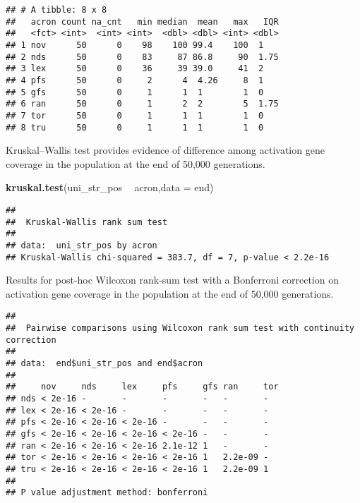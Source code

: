 \documentclass[]{book}
\newenvironment{Shaded}{\begin{snugshade}}{\end{snugshade}}
\newcommand{\DataTypeTok}[1]{\textcolor[rgb]{0.13,0.29,0.53}{#1}}
\newcommand{\KeywordTok}[1]{\textcolor[rgb]{0.13,0.29,0.53}{\textbf{#1}}}
\newcommand{\NormalTok}[1]{#1}
\newcommand{\OperatorTok}[1]{\textcolor[rgb]{0.81,0.36,0.00}{\textbf{#1}}}
\newcommand{\OtherTok}[1]{\textcolor[rgb]{0.56,0.35,0.01}{#1}}
\newcommand{\StringTok}[1]{\textcolor[rgb]{0.31,0.60,0.02}{#1}}
\begin{document}
\begin{verbatim}
## # A tibble: 8 x 8
##   acron count na_cnt   min median  mean   max   IQR
##   <fct> <int>  <int> <int>  <dbl> <dbl> <int> <dbl>
## 1 nov      50      0    98    100 99.4    100  1   
## 2 nds      50      0    83     87 86.8     90  1.75
## 3 lex      50      0    36     39 39.0     41  2   
## 4 pfs      50      0     2      4  4.26     8  1   
## 5 gfs      50      0     1      1  1        1  0   
## 6 ran      50      0     1      2  2        5  1.75
## 7 tor      50      0     1      1  1        1  0   
## 8 tru      50      0     1      1  1        1  0
\end{verbatim}

Kruskal--Wallis test provides evidence of difference among activation gene coverage in the population at the end of 50,000 generations.

\begin{Shaded}
\begin{Highlighting}[]
\KeywordTok{kruskal.test}\NormalTok{(uni_str_pos }\OperatorTok{~}\StringTok{ }\NormalTok{acron,}\DataTypeTok{data =}\NormalTok{ end)}
\end{Highlighting}
\end{Shaded}

\begin{verbatim}
## 
##  Kruskal-Wallis rank sum test
## 
## data:  uni_str_pos by acron
## Kruskal-Wallis chi-squared = 383.7, df = 7, p-value < 2.2e-16
\end{verbatim}

Results for post-hoc Wilcoxon rank-sum test with a Bonferroni correction on activation gene coverage in the population at the end of 50,000 generations.

\begin{Shaded}
\end{Shaded}

\begin{verbatim}
## 
##  Pairwise comparisons using Wilcoxon rank sum test with continuity correction 
## 
## data:  end$uni_str_pos and end$acron 
## 
##     nov     nds     lex     pfs     gfs ran     tor
## nds < 2e-16 -       -       -       -   -       -  
## lex < 2e-16 < 2e-16 -       -       -   -       -  
## pfs < 2e-16 < 2e-16 < 2e-16 -       -   -       -  
## gfs < 2e-16 < 2e-16 < 2e-16 < 2e-16 -   -       -  
## ran < 2e-16 < 2e-16 < 2e-16 2.1e-12 1   -       -  
## tor < 2e-16 < 2e-16 < 2e-16 < 2e-16 1   2.2e-09 -  
## tru < 2e-16 < 2e-16 < 2e-16 < 2e-16 1   2.2e-09 1  
## 
## P value adjustment method: bonferroni
\end{verbatim}
\end{document}
